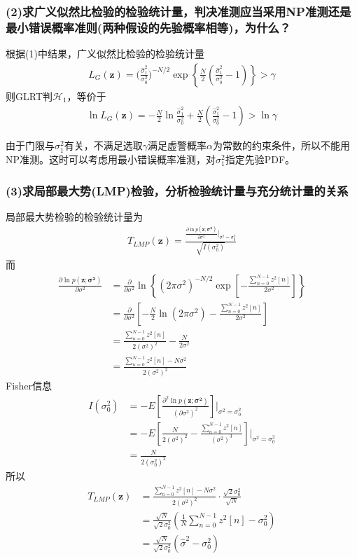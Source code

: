 \documentclass[fontset=windows]{article}
\numberwithin{figure}{section}
\begin{document}
\subsubsection*{(2)求广义似然比检验的检验统计量，判决准测应当采用NP准测还是最小错误概率准则(两种假设的先验概率相等)，为什么？}
根据(1)中结果，广义似然比检验的检验统计量
\begin{align*}
	L_G(\mathbf{z})=\bigg(\frac{\hat{\sigma}_1^2}{\sigma_0^2}\bigg)^{-N/2}\exp\left\{\frac{N}{2}(\frac{\hat{\sigma}_1^2}{\sigma_0^2}-1) \right\}>\gamma
\end{align*}
则GLRT判\(\mathcal{H}_1\)，等价于
\begin{align*}
	\ln L_G(\mathbf{z})=-\frac{N}{2}\ln\frac{\hat{\sigma}_1^2}{\sigma_0^2}+\frac{N}{2}(\frac{\hat{\sigma}_1^2}{\sigma_0^2}-1)>\ln \gamma
\end{align*}

由于门限与\(\sigma^2_1\)有关，不满足选取\(\gamma\)满足虚警概率\(\alpha\)为常数的约束条件，所以不能用NP准测。这时可以考虑用最小错误概率准测，对\(\sigma^2_1\)指定先验PDF。
\subsubsection*{(3)求局部最大势(LMP)检验，分析检验统计量与充分统计量的关系}
局部最大势检验的检验统计量为
\begin{align*}
	T_{LMP}(\mathbf{z})=\frac{\frac{\partial \ln p(\mathbf{z;\sigma^2})}{\partial \sigma^2}|_{\sigma^2=\sigma^2_0}}{\sqrt{I(\sigma^2_0)}}
\end{align*}
而
\begin{align*}
	\frac{\partial \ln p(\mathbf{z;\sigma^2})}{\partial \sigma^2}
	 & =\frac{\partial }{\partial \sigma^2}\ln \left\{(2\pi \sigma^2)^{-N/2}\exp\left[ -\frac{\sum_{n=0}^{N-1}z^2[n]}{2\sigma^2}\right]\right\} \\
	 & =\frac{\partial }{\partial \sigma^2}\left[-\frac{N}{2} \ln(2\pi \sigma^2)-\frac{\sum_{n=0}^{N-1}z^2[n]}{2\sigma^2}\right]                \\
	 & =\frac{\sum_{n=0}^{N-1}z^2[n]}{2(\sigma^2)^2}-\frac{N}{2 \sigma^2}                                                                       \\
	 & =\frac{\sum_{n=0}^{N-1}z^2[n]-N\sigma^2 }{2 (\sigma^2)^2}
\end{align*}
Fisher信息
\begin{align*}
	I(\sigma_0^2)
	 & =-E\left[ \frac{\partial^2 \ln p(\mathbf{z;\sigma^2})}{(\partial \sigma^2)^2}\right]|_{\sigma^2=\sigma^2_0}  \\
	 & =-E\left[ \frac{N}{2 (\sigma^2)^2}-\frac{\sum_{n=0}^{N-1}z^2[n]}{(\sigma^2)^3}\right]|_{\sigma^2=\sigma^2_0} \\
	 & =\frac{N}{2 (\sigma^2_0)^2}
\end{align*}
所以
\begin{align*}
	T_{LMP}(\mathbf{z})
	 & =\frac{\sum_{n=0}^{N-1}z^2[n]-N\sigma^2 }{2 (\sigma^2)^2}\cdot\frac{\sqrt{2}\sigma_0^2}{\sqrt{N}} \\
	 & =\frac{\sqrt{N}}{\sqrt{2}\sigma^2_0}(\frac{1}{N}\sum_{n=0}^{N-1}z^2[n]-\sigma^2_0)                \\
	 & =\frac{\sqrt{N}}{\sqrt{2}\sigma^2_0}(\hat{\sigma}^2-\sigma^2_0)
\end{align*}
\end{document}
